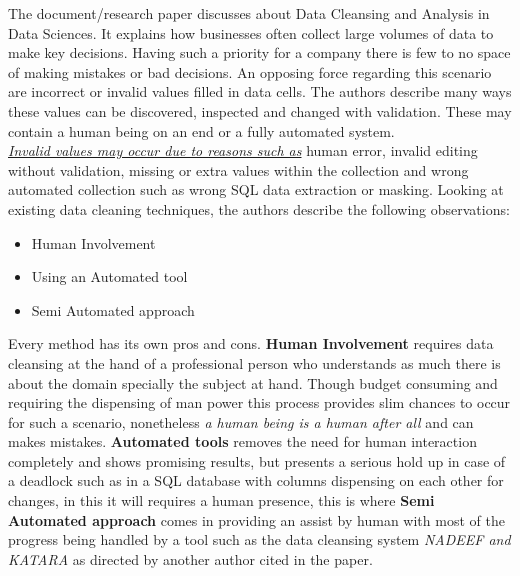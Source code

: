 \documentclass[12pt]{article}
\begin{document}
The document/research paper discusses about Data Cleansing and Analysis in Data Sciences. It explains how businesses often collect large volumes of data to make key decisions. Having such a priority for a company there is few to no space of making mistakes or bad decisions. An opposing force regarding this scenario are incorrect or invalid values filled in data cells. The authors describe many ways these values can be discovered, inspected and changed with validation. These may contain a human being on an end or a fully automated system. \\
\emph{\underline{Invalid values may occur due to reasons such as}} human error, invalid editing without validation, missing or extra values within the collection and wrong automated collection such as wrong SQL data extraction or masking. Looking at existing data cleaning techniques, the authors describe the following observations:
\begin{itemize}
	\item Human Involvement
	\item Using an Automated tool
	\item Semi Automated approach
\end{itemize}
Every method has its own pros and cons. \textbf{Human Involvement} requires data cleansing at the hand of a professional person who understands as much there is about the domain specially the subject at hand. Though budget consuming and requiring the dispensing of man power this process provides slim chances to occur for such a scenario, nonetheless \emph{a human being is a human after all} and can makes mistakes. \textbf{Automated tools} removes the need for human interaction completely and shows promising results, but presents a serious hold up in case of a deadlock such as in a SQL database with columns dispensing on each other for changes, in this it will requires a human presence, this is where \textbf{Semi Automated approach} comes in providing an assist by human with most of the progress being handled by a tool such as the data cleansing system \emph{NADEEF and KATARA} as directed by another author cited in the paper. \\

\newpage
\end{document}
